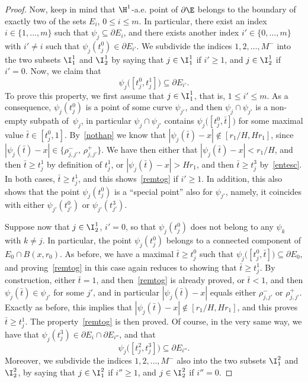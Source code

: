 \begin{proof}
Now, keep in mind that $\H^1$-a.e. point of $\partial\E$ belongs to the boundary of exactly two of the sets $E_i$, $0\leq i \leq m$. In particular, there exist an index $i\in\{1,\dots,m\}$ such that $\psi_j\subseteq \partial E_i$, and there exists another index $i'\in\{0,\dots,m\}$ with $i'\neq i$ such that $\psi_j(t^0_j)\in \partial E_{i'}$. We subdivide the indices $1,2,\dots, M^-$ into the two subsets $\I^1_1$ and $\I^1_2$ by saying that $j\in \I^1_1$ if $i'\geq 1$, and $j\in \I^1_2$ if $i'=0$. Now, we claim that
\begin{equation}\label{remtog}
\psi_j\big( [t^0_j , t^1_j]\big) \subseteq \partial E_{i'}.
\end{equation}
To prove this property, we first assume that $j\in\I^1_1$, that is, $1\leq i' \leq m$. As a con\-se\-quence, $\psi_j(t^0_j)$ is a point of some curve $\psi_{j'}$, and then $\psi_j \cap \psi_{j'}$ is a non-empty subpath of~$\psi_j$, in particular $\psi_j\cap\psi_{j'}$ contains $\psi_j\big( [t^0_j,\bar t] \big)$ for some maximal value $\bar t\in[t^0_j,1]$. By~\eqref{nothap} we know that $|\psi_j(\bar t)-x|\notin [r_1/H,Hr_1]$, since $|\psi_j(\bar t)-x| \in \{\rho^-_{j,j'},\,\rho^+_{j,j'}\}$. We have then either that $|\psi_j(\bar t)-x|<r_1/H$, and then $\bar t\geq t^1_j$ by definition of $t^1_j$, or $|\psi_j(\bar t)-x|>Hr_1$, and then $\bar t\geq t^3_j$ by~\eqref{entesc}. In both cases, $\bar t\geq t^1_j$, and this shows~\eqref{remtog} if $i'\geq 1$. In addition, this also shows that the point $\psi_j(t^0_j)$ is a ``special point'' also for $\psi_{j'}$, namely, it coincides with either $\psi_{j'}(t^0_{j'})$ or $\psi_{j'}(t^3_{j'})$.

Suppose now that $j\in \I^1_2$, \ie $i'=0$, so that $\psi_j(t^0_j)$ does not belong to any $\psi_k$ with $k\neq j$. In particular, the point $\psi_j(t^0_j)$ belongs to a connected component of $E_0\cap B(x,r_0)$. As before, we have a maximal $\bar t\geq t^0_j$ such that $\psi_j\big([t^0_j,\bar t]\big)\subseteq \partial E_0$, and proving~\eqref{remtog} in this case again reduces to showing that $\bar t\geq t^1_j$. By construction, either $\bar t=1$, and then~\eqref{remtog} is already proved, or $\bar t<1$, and then $\psi_j(\bar t)\in \psi_{j'}$ for some $j'$, and in particular $|\psi_j(\bar t)-x|$ equals either $\rho^-_{j,j'}$ or $\rho^+_{j,j'}$. Exactly as before, this implies that $|\psi_j(\bar t)-x|\notin [r_1/H,Hr_1]$, and this proves $\bar t\geq t^1_j$. The property~\eqref{remtog} is then proved. Of course, in the very same way, we have that $\psi_j(t^3_j)\in \partial E_i \cap \partial E_{i''}$, and that
\begin{equation}\label{remtog2}
\psi_j\big( [t^2_j , t^3_j]\big) \subseteq \partial E_{i''}.
\end{equation}
Moreover, we subdivide the indices $1,2,\dots, M^-$ also into the two subsets $\I^2_1$ and $\I^2_2$, by saying that $j\in \I^2_1$ if $i''\geq 1$, and $j \in \I^2_2$ if $i''=0$.


\end{proof}
